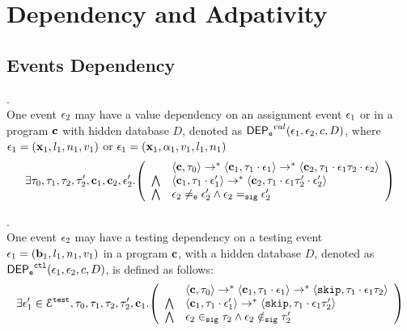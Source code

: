 %
\section{Dependency and Adpativity}
%
%
\subsection{Events Dependency}
%
%
\begin{defn}
\label{def:event_valdep}.
\\
One event $\mathtt{\epsilon}_2$ may have a value dependency on an assignment event $\mathtt{\epsilon}_1$ or 
in a program ${\boldsymbol{\mathbf{c}}}$
with hidden database $D$, denoted as 
%
$\mathsf{DEP_{\mathtt{e}}}^{val}(\mathtt{\epsilon}_1, \mathtt{\epsilon}_2, c, D)$, where $\mathtt{\epsilon}_1 = ({\boldsymbol{\mathbf{x}}}_1, l_1, n_1, v_1) $ or 
$\mathtt{\epsilon}_1 = ({\boldsymbol{\mathbf{x}}}_1, \alpha_1, v_1, l_1, n_1)$
%
\[
\exists \vtrace_0,
\vtrace_1, \vtrace_2, \vtrace_2', \ssa{c}_1, \ssa{c}_2, \event_2'.
  \left(
  \begin{array}{ll}   
 & \config{\ssa{c}, \vtrace_0} \rightarrow^{*} 
\config{\ssa{c}_1, \vtrace_1 \cdot \event_1}  \rightarrow^{*} 
  \config{\ssa{c}_2,  \vtrace_1 \cdot \event_1 \vtrace_2 \cdot \event_2 } 
 \\ 
 \bigwedge &
  \config{\ssa{c}_1, \vtrace_1 \cdot \event_1'}  \rightarrow^{*} 
  \config{\ssa{c}_2,  \vtrace_1 \cdot \event_1 \vtrace_2' \cdot \event_2' } 
\\
\bigwedge &
\event_2 \eventneq \event_2' \land \event_2 \sigeq \event_2'
\end{array}
\right)
 \]
%
\end{defn}
%
\begin{defn}
\label{def:event_testdep}.
\\
One event $\mathtt{\epsilon}_2$ may have a testing dependency on a testing event $\mathtt{\epsilon}_1 = ({\boldsymbol{\mathbf{b}}}_1, l_1, n_1, v_1)$
in a program ${\boldsymbol{\mathbf{c}}}$, with a hidden database $D$, 
denoted as 
%
$\mathsf{DEP_{\mathtt{e}}}^{\mathtt{{ctl}}}(\mathtt{\epsilon}_1, \mathtt{\epsilon}_2, c, D)$, is defined as follows: 
%
\[
\exists \event_1' \in \eventset^{\test}, \vtrace_0,
\vtrace_1, \vtrace_2, \vtrace_2', \ssa{c}_1.
  \left(
  \begin{array}{ll}   
  & \config{\ssa{c}, \vtrace_0} \rightarrow^{*} 
    \config{\ssa{c}_1, \vtrace_1 \cdot \event_1}  \rightarrow^{*} 
    \config{\eskip,  \vtrace_1 \cdot \event_1 \vtrace_2} 
  \\ 
  \bigwedge &
  \config{\ssa{c}_1, \vtrace_1 \cdot \event_1'}  \rightarrow^{*} 
  \config{\eskip,  \vtrace_1 \cdot \event_1 \vtrace_2' } 
  \\
  \bigwedge &
  \event_2 \sigin \vtrace_2 \land \event_2 \notsigin \vtrace_2'
\end{array}
\right)
 \]
%
\end{defn}
